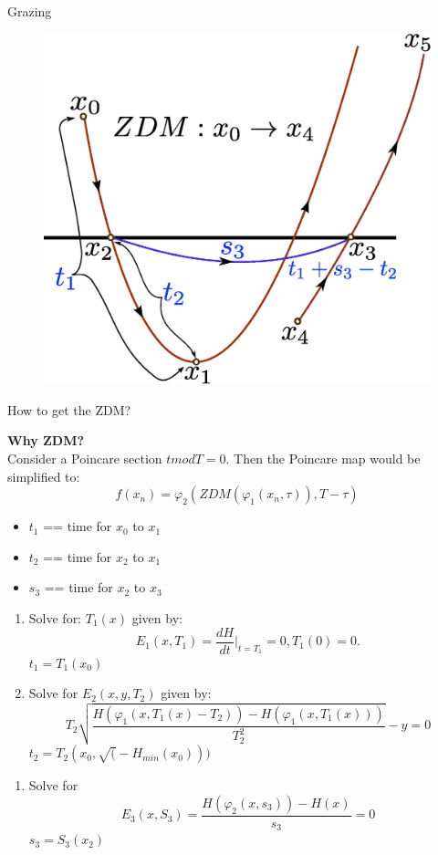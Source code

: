 \documentclass[xcolor=x11names,compress]{beamer}
\renewcommand{\(}{\begin{columns}}
\renewcommand{\)}{\end{columns}}
\newcommand{\<}[1]{\begin{column}{#1}}
\renewcommand{\>}{\end{column}}
\begin{document}
\begin{frame}{Grazing}

\begin{figure}
\caption{}
\begin{center}
\includegraphics[height=0.7\textheight]{ZDM}
\end{center}
\end{figure}
\end{frame}



\begin{frame}{How to get the ZDM?}

{\bf Why ZDM?}\\
Consider a Poincare section $t mod T=0$. Then the Poincare map would be 
simplified to:\\
\[
f(x_n)=\varphi_2(ZDM(\varphi_1(x_n,\tau)),T-\tau)
\] 


\begin{itemize}
\item $t_1$ == time for $x_0$ to $x_1$
\item $t_2$ == time for $x_2$ to $x_1$
\item $s_3$ == time for $x_2$ to $x_3$
\end{itemize}

\begin{enumerate}
\item Solve for: $T_1(x)$ given by:\[
E_1(x,T_1)=\frac{dH}{dt}|_{t=T_1}=0, T_1(0)=0.
\]
$t_1=T_1(x_0)$
\item Solve for $E_2(x,y,T_2)$ given by:
\[
T_2\sqrt{\frac{H(\varphi_1(x,T_1(x)-T_2))-H(\varphi_1(x,T_1(x)))}{T_2^2}}-y=0
\]
$t_2=T_2(x_0,\sqrt(-H_{min}(x_0)))$

\end{enumerate}

\end{frame}

\begin{frame}
\begin{enumerate}
\item Solve for \[
E_3(x,S_3)=\frac{H(\varphi_2(x,s_3))-H(x)}{s_3}=0
\]
$s_3=S_3(x_2)$
\end{enumerate}

\end{frame}
\end{document}

